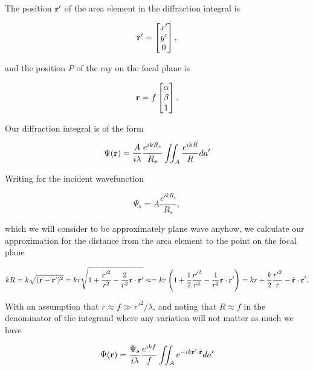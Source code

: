 {The position $\mathbf{r}'$ of the area element in the diffraction integral is

\begin{equation}\label{eqn:modernOptics:ProblemSet2:P1:50}
\mathbf{r}' =
\begin{bmatrix}
x' \\
y' \\
0
\end{bmatrix},
\end{equation}

and the position $P$ of the ray on the focal plane is

\begin{equation}\label{eqn:modernOptics:ProblemSet2:P1:70}
\mathbf{r} = f
\begin{bmatrix}
\alpha \\
\beta \\
1
\end{bmatrix}.
\end{equation}

Our diffraction integral is of the form

\begin{equation}\label{eqn:modernOptics:ProblemSet2:P1:90}
\Psi(\mathbf{r}) = \frac{A}{i \lambda} \frac{e^{i k R_s}}{R_s} \iint_A \frac{e^{i k R}}{R} da'
\end{equation}

Writing for the incident wavefunction

\begin{equation}\label{eqn:modernOptics:ProblemSet2:P1:110}
\Psi_s = A \frac{e^{i k R_s}}{R_s},
\end{equation}

which we will consider to be approximately plane wave anyhow, we calculate our approximation for the distance from the area element to the point on the focal plane

\begin{dmath}\label{eqn:modernOptics:ProblemSet2:P1:130}
k R
= k \sqrt{ (\Br - \Br')^2 }
= k r \sqrt{ 1 + \frac{{r'}^2}{r^2} - \frac{2}{r^2} \Br \cdot \Br' }
\approx
= k r \left( 1 + \inv{2} \frac{{r'}^2}{r^2} - \frac{1}{r^2} \Br \cdot \Br' \right)
= k r + \frac{k}{2} \frac{{r'}^2}{r} - \rcap \cdot \Br' .
\end{dmath}

With an assumption that $r \approx f \gg {r'}^2/\lambda$, and noting that $R \approx f$ in the denominator of the integrand where any variation will not matter as much we have

\begin{equation}\label{eqn:modernOptics:ProblemSet2:P1:150}
\Psi(\mathbf{r}) = \frac{\Psi_s}{i \lambda} \frac{e^{i k f}}{f} \iint_A e^{-i k \mathbf{r}' \cdot \hat{\mathbf{r}} } da'
\end{equation}

}
